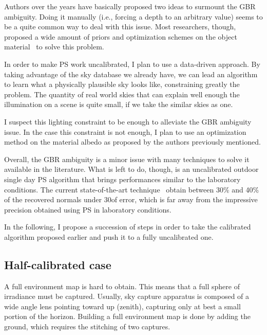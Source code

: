 Authors over the years have basically proposed two ideas to surmount the GBR ambiguity. Doing it manually (i.e., forcing a depth to an arbitrary value) seems to be a quite common way to deal with this issue. Most researchers, though, proposed a wide amount of priors and optimization schemes on the object material~\cite{tan-cvpr-07,alldrin-cvpr-08,abrams-eccv-12,queau-jmiv-14} to solve this problem.

In order to make PS work uncalibrated, I plan to use a data-driven approach. By taking advantage of the sky database we already have, we can lead an algorithm to learn what a physically plausible sky looks like, constraining greatly the problem. The quantity of real world skies that can explain well enough the illumination on a scene is quite small, if we take the similar skies as one.

I suspect this lighting constraint to be enough to alleviate the GBR ambiguity issue. In the case this constraint is not enough, I plan to use an optimization method on the material albedo as proposed by the authors previously mentioned.

Overall, the GBR ambiguity is a minor issue with many techniques to solve it available in the literature. What is left to do, though, is an uncalibrated outdoor single day PS algorithm that brings performances similar to the laboratory conditions. The current state-of-the-art technique~\cite{jung-cvpr-15} obtain between 30\% and 40\% of the recovered normals under 30\degree of error, which is far away from the impressive precision obtained using PS in laboratory conditions.

In the following, I propose a succession of steps in order to take the calibrated algorithm proposed earlier and push it to a fully uncalibrated one.


\subsection{Half-calibrated case}
A full environment map is hard to obtain. This means that a full sphere of irradiance must be captured. Usually, sky capture apparatus is composed of a wide angle lens pointing toward up (zenith), capturing only at best a small portion of the horizon. Building a full environment map is done by adding the ground, which requires the stitching of two captures.

